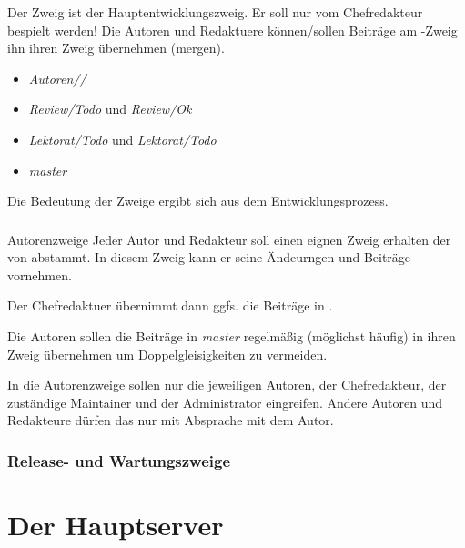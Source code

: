 \documentclass[
ngerman,
paper=a4,
asymmetric,
fontsize=10pt,
draft=false,
numbers=noenddot,
bibtotocnumbered,
footnotes=multiple,
toc=flat,
]{scrbook}
\newcommand{\Branch}[1]{\emph{#1}}
\begin{document}
Der Zweig  ist der Hauptentwicklungszweig. Er soll nur vom
Chefredakteur bespielt werden! Die Autoren und Redaktuere können/sollen
Beiträge am -Zweig ihn ihren Zweig übernehmen (mergen).


\begin{itemize}
  \item {}
  \Branch{Autoren//}
  \item {}
  \Branch{Review/Todo} und \Branch{Review/Ok}
  \item {}
  \Branch{Lektorat/Todo} und \Branch{Lektorat/Todo}
  \item {} \Branch{master}
\end{itemize}

Die Bedeutung der Zweige ergibt sich aus dem
Entwicklungsprozess.

\subsubsection{}



\Text
{Autorenzweige}
{Jeder Autor und Redakteur soll einen
eignen Zweig erhalten der von  abstammt. In
diesem Zweig kann er seine Ändeurngen und Beiträge vornehmen. }
{}
{}
{}
{}


Der Chefredaktuer übernimmt dann ggfs. die Beiträge in . 

Die Autoren sollen die Beiträge in \Branch{master}
regelmäßig (möglichst häufig) in ihren Zweig übernehmen um
Doppelgleisigkeiten zu vermeiden.

In die Autorenzweige sollen nur die jeweiligen Autoren, der Chefredakteur, der
zuständige Maintainer und der Administrator eingreifen.
Andere Autoren und Redakteure dürfen das nur mit Absprache
mit dem Autor.



\subsubsection{Release- und Wartungszweige}



\section{Der Hauptserver}
\end{document}
